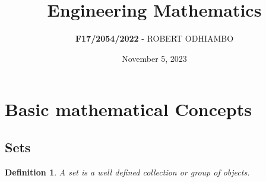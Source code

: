 \documentclass[12pt]{report}
\title{\textbf{Engineering Mathematics}}
\author{\textbf{F17/2054/2022} - ROBERT ODHIAMBO}
\date{November 5, 2023}
\newtheorem{definition}{Definition}
\begin{document}
\maketitle

\chapter*{Basic mathematical Concepts}

    \section*{Sets}
        \begin{definition}
            A set is a well defined collection or group of objects.
        \end{definition}
\end{document}
